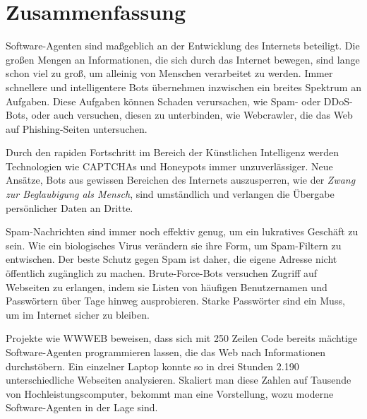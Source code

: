 \section{Zusammenfassung}
\label{sec:zusammenfassung}

Software-Agenten sind maßgeblich an der Entwicklung des Internets beteiligt.
Die großen Mengen an Informationen, die sich durch das Internet bewegen, sind
lange schon viel zu groß, um alleinig von Menschen verarbeitet zu werden. Immer
schnellere und intelligentere Bots übernehmen inzwischen ein breites Spektrum
an Aufgaben. Diese Aufgaben können Schaden verursachen, wie Spam- oder
DDoS-Bots, oder auch versuchen, diesen zu unterbinden, wie Webcrawler, die das
Web auf Phishing-Seiten untersuchen.

Durch den rapiden Fortschritt im Bereich der Künstlichen Intelligenz werden
Technologien wie CAPTCHAs und Honeypots immer unzuverlässiger. Neue Ansätze,
Bots aus gewissen Bereichen des Internets auszusperren, wie der \emph{Zwang zur
Beglaubigung als Mensch}, sind umständlich und verlangen die Übergabe
persönlicher Daten an Dritte.

Spam-Nachrichten sind immer noch effektiv genug, um ein lukratives Geschäft zu
sein. Wie ein biologisches Virus verändern sie ihre Form, um Spam-Filtern zu
entwischen. Der beste Schutz gegen Spam ist daher, die eigene Adresse nicht
öffentlich zugänglich zu machen. Brute-Force-Bots versuchen Zugriff auf
Webseiten zu erlangen, indem sie Listen von häufigen Benutzernamen und
Passwörtern über Tage hinweg ausprobieren. Starke Passwörter sind ein Muss, um
im Internet sicher zu bleiben.

Projekte wie WWWEB beweisen, dass sich mit 250 Zeilen Code bereits mächtige
Software-Agenten programmieren lassen, die das Web nach Informationen
durchstöbern. Ein einzelner Laptop konnte so in drei Stunden 2.190
unterschiedliche Webseiten analysieren. Skaliert man diese Zahlen auf Tausende
von Hochleistungscomputer, bekommt man eine Vorstellung, wozu moderne
Software-Agenten in der Lage sind.
